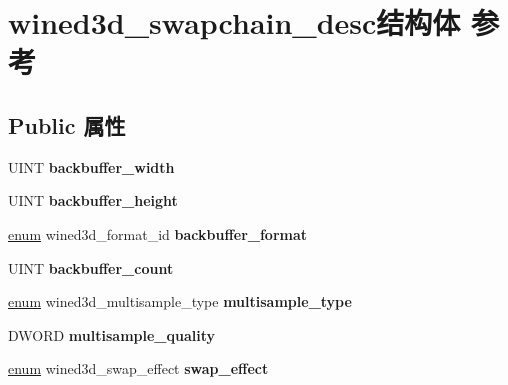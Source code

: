 \hypertarget{structwined3d__swapchain__desc}{}\section{wined3d\+\_\+swapchain\+\_\+desc结构体 参考}
\label{structwined3d__swapchain__desc}
\subsection*{Public 属性}
\begin{DoxyCompactItemize}
\item 
\mbox{\label{structwined3d__swapchain__desc_aafc2f4f5a3cea9097ac9fef4a59f0160}} 
U\+I\+NT {\bfseries backbuffer\+\_\+width}
\item 
\mbox{\label{structwined3d__swapchain__desc_ae137fe3d9f1c6fc72487012d838d0c6b}} 
U\+I\+NT {\bfseries backbuffer\+\_\+height}
\item 
\mbox{\label{structwined3d__swapchain__desc_a94a6b2f19e276f8faee801238e2d6b88}} 
\hyperlink{interfaceenum}{enum} wined3d\+\_\+format\+\_\+id {\bfseries backbuffer\+\_\+format}
\item 
\mbox{\label{structwined3d__swapchain__desc_a6b9279b8d2e45e3704a6a61f588f7136}} 
U\+I\+NT {\bfseries backbuffer\+\_\+count}
\item 
\mbox{\label{structwined3d__swapchain__desc_a66448481603dd0431c299d1f00baf635}} 
\hyperlink{interfaceenum}{enum} wined3d\+\_\+multisample\+\_\+type {\bfseries multisample\+\_\+type}
\item 
\mbox{\label{structwined3d__swapchain__desc_a324e9cb24717846fd4f7a7a3a7b75fa9}} 
D\+W\+O\+RD {\bfseries multisample\+\_\+quality}
\item 
\mbox{\label{structwined3d__swapchain__desc_aa876551c7f179b6d941525e41d5f9426}} 
\hyperlink{interfaceenum}{enum} wined3d\+\_\+swap\+\_\+effect {\bfseries swap\+\_\+effect}
\item 
\mbox{\label{structwined3d__swapchain__desc_af511f80a6882e06d306cab3a96b32931}} 

\end{DoxyCompactItemize}
